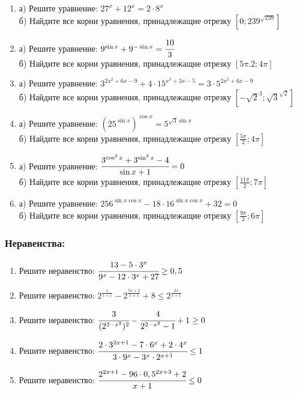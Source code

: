 \documentclass[12pt]{article}
\begin{document}
\begin{enumerate}[start=1,label={\itshape\bfseries \arabic*.}]

\item а) Решите уравнение: $27^x + 12^x = 2 \cdot 8^x$\\
      б) Найдите все корни уравнения, принадлежащие отрезку $[0; 239^{\sqrt{239}}]$

\item а) Решите уравнение: $9^{\sin{x}} + 9^{-\sin{x}} = \cfrac{10}{3}$\\
      б) Найдите все корни уравнения, принадлежащие отрезку $[5\pi. 2; 4\pi]$

 \item а) Решите уравнение: $3^{2x^2 + 6x - 9} + 4\cdot15^{x^2 + 3x - 5} = 3 \cdot 5^{2x^2 + 6x - 9}$\\
       б) Найдите все корни уравнения, принадлежащие отрезку $[-\sqrt{2}^3; \sqrt{3}^{\sqrt{2}}]$

 \item а) Решите уравнение: $(25^{\sin{x}})^{\cos{x}} = 5^{\sqrt{3}\sin{x}}$\\
       б) Найдите все корни уравнения, принадлежащие отрезку $[\frac{5\pi}{2}; 4\pi]$

\item а) Решите уравнение: $\cfrac{3^{\cos^2{x}} + 3^{\sin^2{x}} - 4}{\sin{x} + 1} = 0$\\
      б) Найдите все корни уравнения, принадлежащие отрезку $[\frac{11\pi}{2}; 7\pi]$

\item а) Решите уравнение: $256^{\sin{x}\cos{x}} - 18 \cdot 16^{\sin{x}\cos{x}} + 32 = 0$\\
      б) Найдите все корни уравнения, принадлежащие отрезку $[\frac{9\pi}{2}; 6\pi]$
 \end{enumerate}

 \subsubsection*{Неравенства:}

 \begin{enumerate}[start=1,label={\itshape\bfseries \arabic*.}]

\item Решите неравенство: $\cfrac{13 - 5 \cdot 3^x}{9^x - 12 \cdot 3^x + 27} \ge 0,5$

\item Решите неравенство: $2^{\frac{x}{x + 1}} - 2^{\frac{5x + 3}{x + 1}} + 8 \le 2^{\frac{2x}{x + 1}}$

\item Решите неравенство: $\cfrac{3}{(2^{2 - x^2})^2} - \cfrac{4}{2^{2 - x^2} - 1} + 1 \ge 0$

\item Решите неравенство: $\cfrac{2 \cdot 3^{2x + 1} - 7 \cdot 6^x + 2 \cdot 4^x}{3 \cdot 9^x - 3^x \cdot 2^{x + 1 }} \le 1$

\item Решите неравенство: $\cfrac{2^{2x + 1} - 96 \cdot 0,5^{2x + 3} + 2}{x + 1} \le 0$

\end{enumerate}
\end{document}
